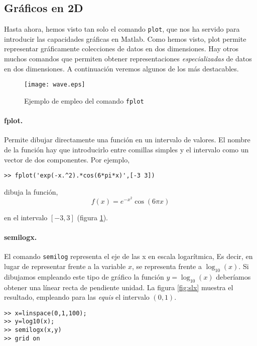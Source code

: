 \subsection{Gráficos en 2D} 
Hasta ahora, hemos visto tan solo el comando \texttt{plot}, que nos ha servido para introducir las capacidades gráficas en Matlab. Como hemos visto, plot permite representar gráficamente colecciones de datos en dos dimensiones. Hay otros muchos comandos que permiten obtener representaciones \emph{especializadas} de datos en dos dimensiones. A continuación veremos algunos de los más destacables.
\begin{figure}[h]
\centering
\texttt{[image: wave.eps]}
\caption{Ejemplo de empleo del comando \texttt{fplot}}
\label{fig:wave}
\end{figure} 

\paragraph{fplot.} Permite dibujar directamente una función en un intervalo de valores. El nombre de la función hay que introducirlo entre comillas simples y el intervalo como un vector de dos componentes. Por ejemplo,

\begin{verbatim}
>> fplot('exp(-x.^2).*cos(6*pi*x)',[-3 3])
\end{verbatim}

dibuja la función,
\begin{equation*}
f(x)=e^{-x^2}\cos(6\pi x)
\end{equation*}

en el intervalo $[-3,3]$ (figura \ref{fig:wave}).

 
\paragraph{semilogx.} El comando \texttt{semilog} representa el eje de las x en escala logarítmica, Es decir, en lugar de representar frente a la variable $x$, se representa frente a $\log_{10}(x)$. Si dibujamos empleando este tipo de gráfico la función $y=\log_{10}(x)$ deberíamos obtener una línear recta de pendiente unidad. La figura \ref{fig:slx} muestra el resultado, empleando para las \emph{equis} el intervalo $(0,1)$.
\begin{verbatim}
>> x=linspace(0,1,100);
>> y=log10(x);
>> semilogx(x,y)
>> grid on
\end{verbatim}

